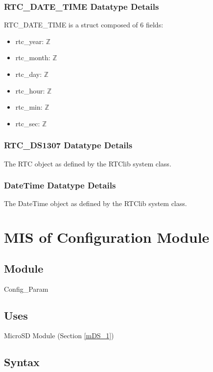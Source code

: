 \documentclass[12pt, titlepage]{article}
\begin{document}
\subsubsection{RTC\_DATE\_TIME Datatype Details}

RTC\_DATE\_TIME is a struct composed of 6 fields:

\begin{itemize}
\item rtc\_year: $\mathbb{Z}$
\item rtc\_month: $\mathbb{Z}$
\item rtc\_day: $\mathbb{Z}$
\item rtc\_hour: $\mathbb{Z}$
\item rtc\_min: $\mathbb{Z}$
\item rtc\_sec: $\mathbb{Z}$
\end{itemize}

\subsubsection{RTC\_DS1307 Datatype Details}
The RTC object as defined by the RTClib system class.


\subsubsection{DateTime Datatype Details}
The DateTime object as defined by the RTClib system class.

\newpage



\section{MIS of Configuration Module} \label{mPS2} 

\subsection{Module}

Config\_Param

\subsection{Uses}

MicroSD Module (Section \ref{mDS_1})

\subsection{Syntax}
\end{document}

